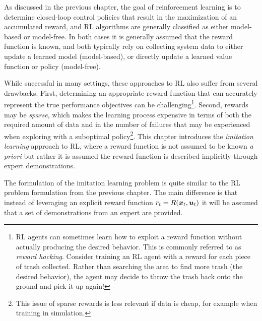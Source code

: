 As discussed in the previous chapter, the goal of reinforcement learning is to determine closed-loop control policies that result in the maximization of an accumulated reward, and RL algorithms are generally classified as either model-based or model-free. In both cases it is generally assumed that the reward function is known, and both typically rely on collecting system data to either update a learned model (model-based), or directly update a learned value function or policy (model-free).

While successful in many settings, these approaches to RL also suffer from several drawbacks. First, determining an appropriate reward function that can accurately represent the true performance objectives can be challenging\footnote{RL agents can sometimes learn how to exploit a reward function without actually producing the desired behavior. This is commonly referred to as \textit{reward hacking}. Consider training an RL agent with a reward for each piece of trash collected. Rather than searching the area to find more trash (the desired behavior), the agent may decide to throw the trash back onto the ground and pick it up again!}. Second, rewards may be \textit{sparse}, which makes the learning process expensive in terms of both the required amount of data and in the number of failures that may be experienced when exploring with a suboptimal policy\footnote[][\baselineskip]{This issue of sparse rewards is less relevant if data is cheap, for example when training in simulation.}. This chapter introduces the \textit{imitation learning} approach to RL, where a reward function is not assumed to be known \textit{a priori} but rather it is assumed the reward function is described implicitly through expert demonstrations. 


The formulation of the imitation learning problem is quite similar to the RL problem formulation from the previous chapter. The main difference is that instead of leveraging an explicit reward function $r_t = R(\bm{x}_t, \bm{u}_t)$ it will be assumed that a set of demonstrations from an expert are provided.

